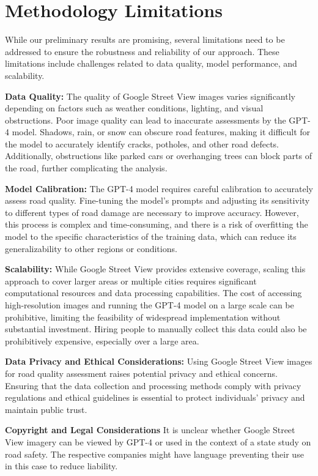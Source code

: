 \documentclass{article}
\begin{document}
\section{Methodology Limitations}

While our preliminary results are promising, several limitations need to be addressed to ensure the robustness and reliability of our approach. These limitations include challenges related to data quality, model performance, and scalability.

\textbf{Data Quality:}
The quality of Google Street View images varies significantly depending on factors such as weather conditions, lighting, and visual obstructions. Poor image quality can lead to inaccurate assessments by the GPT-4 model. Shadows, rain, or snow can obscure road features, making it difficult for the model to accurately identify cracks, potholes, and other road defects. Additionally, obstructions like parked cars or overhanging trees can block parts of the road, further complicating the analysis.

\textbf{Model Calibration:}
The GPT-4 model requires careful calibration to accurately assess road quality. Fine-tuning the model's prompts and adjusting its sensitivity to different types of road damage are necessary to improve accuracy. However, this process is complex and time-consuming, and there is a risk of overfitting the model to the specific characteristics of the training data, which can reduce its generalizability to other regions or conditions.

\textbf{Scalability:}
While Google Street View provides extensive coverage, scaling this approach to cover larger areas or multiple cities requires significant computational resources and data processing capabilities. The cost of accessing high-resolution images and running the GPT-4 model on a large scale can be prohibitive, limiting the feasibility of widespread implementation without substantial investment. Hiring people to manually collect this data could also be prohibitively expensive, especially over a large area.

\textbf{Data Privacy and Ethical Considerations:}
Using Google Street View images for road quality assessment raises potential privacy and ethical concerns. Ensuring that the data collection and processing methods comply with privacy regulations and ethical guidelines is essential to protect individuals' privacy and maintain public trust.

\textbf{Copyright and Legal Considerations}
It is unclear whether Google Street View imagery can be viewed by GPT-4 or used in the context of a state study on road safety. The respective companies might have language preventing their use in this case to reduce liability.
\end{document}
